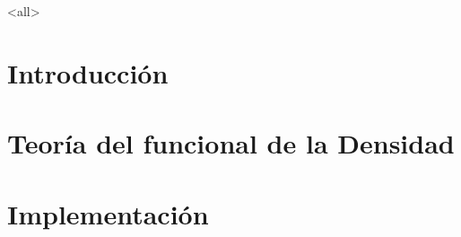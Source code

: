 \mode<all>

\section{Introducción}

\section{Teoría del funcional de la Densidad}




\section{Implementación}







